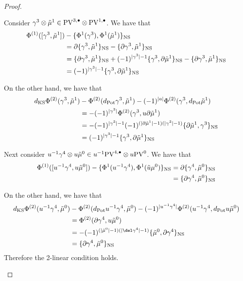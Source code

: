 \documentclass[11pt]{amsart}
\def\PV{{\rm PV}}
\begin{document}
\begin{proof}
\begin{itemize}
      Consider $\gamma^{3}\otimes \tilde \mu^{1}\in \PV^{3,\bu}\otimes \PV^{1,\bu}$. We have that
      \begin{align*}
        \Phi^{(1)}([\gamma^{3},\tilde \mu^{1}]) &-\{\Phi^{1}(\gamma^{3}),\Phi^{1}(\tilde \mu^{1})\}_{\rm NS} \\
        &= \partial\{\gamma^{3}, \tilde \mu^{1}\}_{\rm NS}-\{\partial \gamma^{3}, \tilde \mu^{1}\}_{\rm NS} \\
        &= \{\partial \gamma^{3}, \tilde \mu^{1}\}_{\rm NS}+(-1)^{|\gamma^{3}|-1}\{\gamma^{3}, \partial \tilde \mu^{1}\}_{\rm NS} - \{\partial\gamma^{3}, \tilde \mu^{1}\}_{\rm NS} \\
        &= (-1)^{|\gamma^{3}|-1}\{\gamma^{3}, \partial \tilde \mu^{1}\}_{\rm NS}
      \end{align*}

      On the other hand, we have that
      \begin{align*}
        d_{\rm KS}\Phi^{(2)}(\gamma^{3},\tilde\mu^{1}) & -\Phi^{(2)}(d_{\rm Pot}\gamma^{3}, \tilde \mu^{1})-(-1)^{|a|}\Phi^{(2)}(\gamma^{3},d_{\rm Pot}\tilde\mu^{1})\\
        &= -(-1)^{|\gamma^{3}|}\Phi^{(2)}(\gamma^{3}, u\partial \tilde \mu^{1}) \\
        &= -(-1)^{|\gamma^{3}|-1}(-1)^{(|\partial\tilde\mu^{1}|-1)(|\gamma^{3}|-1)}\{\partial \tilde\mu^{1},\gamma^{3}\}_{\rm NS}\\
        &= (-1)^{|\gamma^{3}|-1}\{\gamma^{3},\partial\tilde\mu^{1}\}_{\rm NS}
      \end{align*}

      Next consider $u^{-1}\gamma^{4}\otimes u \tilde\mu^{0}\in u^{-1}\PV^{4,\bu}\otimes u\PV^{0}$. We have that
       \begin{align*}
         \Phi^{(1)}([u^{-1}\gamma^{4},u\tilde \mu^{0}])-\{\Phi^{1}(u^{-1}\gamma^{4}),\Phi^{1}(\tilde u\mu^{0})\}_{\rm NS} &= \partial\{\gamma^{4}, \tilde \mu^{0}\}_{\rm NS} \\
         &= \{\partial \gamma^{4}, \tilde\mu^{0}\}_{\rm NS}
      \end{align*}

      On the other hand, we have that
      \begin{align*}
        d_{\rm KS}\Phi^{(2)}(u^{-1}\gamma^{4},\tilde\mu^{0}) & -\Phi^{(2)}(d_{\rm Pot}u^{-1}\gamma^{4}, \tilde \mu^{0})-(-1)^{|u^{-1}\gamma^{4}|}\Phi^{(2)}(u^{-1}\gamma^{4},d_{\rm Pot}u\tilde\mu^{0}) \\
        &=\Phi^{(2)}(\partial\gamma^{4},u\tilde\mu^{0})\\
        &= -(-1)^{(|\tilde \mu^{0}|-1)(|\del\gamma^{4}|-1)}\{\tilde\mu^{0}, \partial\gamma^{4}\}_{\rm NS} \\
        &= \{\partial \gamma^{4}, \tilde\mu^{0}\}_{\rm NS}
      \end{align*}
      Therefore the 2-linear condition holds.


\end{itemize}
\end{proof}
\end{document}

